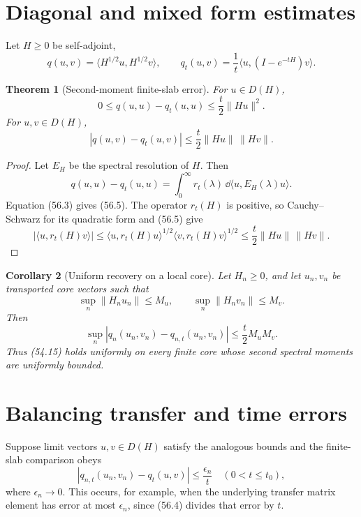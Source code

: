 \documentclass[11pt]{article}
\newtheorem{theorem}{Theorem}[section]
\newtheorem{corollary}[theorem]{Corollary}
\theoremstyle{remark}
\begin{document}
\section{Diagonal and mixed form estimates}

Let \(H\geq0\) be self-adjoint,
\[
 q(u,v)=\langle H^{1/2}u,H^{1/2}v\rangle,\qquad
 q_t(u,v)=\frac1t\langle u,(I-e^{-tH})v\rangle.          \tag{56.4}
\]

\begin{theorem}[Second-moment finite-slab error]
\label{thm:v15v56-second-moment}
For \(u\in D(H)\),
\[
 \boxed{
 0\leq q(u,u)-q_t(u,u)
 \leq\frac t2\|Hu\|^2.}                                 \tag{56.5}
\]
For \(u,v\in D(H)\),
\[
 \boxed{
 |q(u,v)-q_t(u,v)|
 \leq\frac t2\|Hu\|\,\|Hv\|.}                           \tag{56.6}
\]
\end{theorem}

\begin{proof}
Let \(E_H\) be the spectral resolution of \(H\).  Then
\[
 q(u,u)-q_t(u,u)
 =\int_0^\infty r_t(\lambda)\,
       \dd\langle u,E_H(\lambda)u\rangle.
\]
Equation (56.3) gives (56.5).  The operator
\(r_t(H)\) is positive, so Cauchy--Schwarz for its quadratic form
and (56.5) give
\[
 |\langle u,r_t(H)v\rangle|
 \leq
 \langle u,r_t(H)u\rangle^{1/2}
 \langle v,r_t(H)v\rangle^{1/2}
 \leq\frac t2\|Hu\|\,\|Hv\|.
\]
\end{proof}

\begin{corollary}[Uniform recovery on a local core]
\label{cor:v15v56-uniform-core}
Let \(H_n\geq0\), and let \(u_n,v_n\) be transported core vectors
such that
\[
 \sup_n\|H_nu_n\|\leq M_u,\qquad
 \sup_n\|H_nv_n\|\leq M_v.                              \tag{56.7}
\]
Then
\[
 \sup_n|q_n(u_n,v_n)-q_{n,t}(u_n,v_n)|
 \leq\frac t2M_uM_v.                                    \tag{56.8}
\]
Thus (54.15) holds uniformly on every finite core whose second
spectral moments are uniformly bounded.
\end{corollary}

\section{Balancing transfer and time errors}

Suppose limit vectors \(u,v\in D(H)\) satisfy the analogous bounds
and the finite-slab comparison obeys
\[
 |q_{n,t}(u_n,v_n)-q_t(u,v)|
 \leq\frac{\epsilon_n}{t}
 \quad(0<t\leq t_0),                                    \tag{56.9}
\]
where \(\epsilon_n\to0\).  This occurs, for example, when the
underlying transfer matrix element has error at most
\(\epsilon_n\), since (56.4) divides that error by \(t\).
\end{document}
